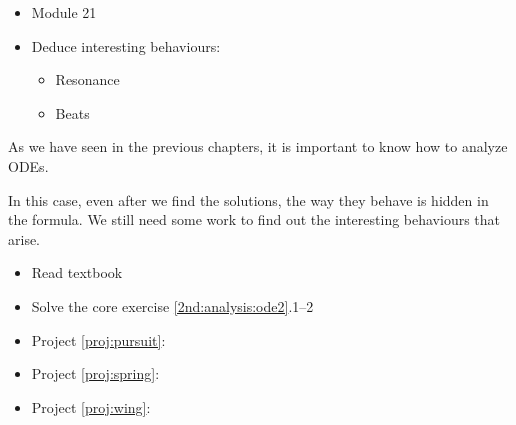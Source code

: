 \begin{lesson}

	\begin{itemize}
		\item Module 21
	\end{itemize}

	\begin{itemize}
		\item Deduce interesting behaviours:
		\begin{itemize}
			\item Resonance
			\item Beats
		\end{itemize}
	\end{itemize}
	

As we have seen in the previous chapters, it is important to know how to analyze ODEs.

In this case, even after we find the solutions, the way they behave is hidden in the formula. We still need some work to find out the interesting behaviours that arise.

\begin{itemize}
	\item Read textbook
	\item Solve the core exercise \ref{2nd:analysis:ode2}.1--2
\end{itemize}

\begin{itemize}
	\item Project \ref{proj:pursuit}: \pursuittitle
	\item Project \ref{proj:spring}: \springtitle
	\item Project \ref{proj:wing}: \wingtitle
\end{itemize}


\end{lesson}

